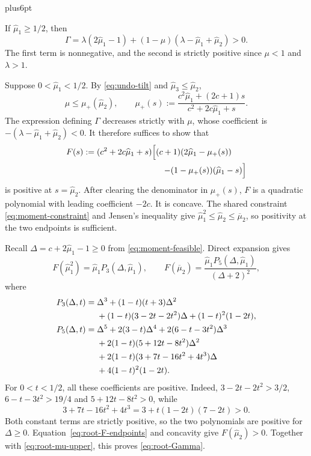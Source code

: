 \documentclass[11pt,reqno]{amsart}
\makeatletter
\theoremstyle{plain}
\theoremstyle{definition}
\theoremstyle{remark}
\renewenvironment{proof}[1][\proofname]{%
  \par
  \pushQED{\qed}%
  \normalfont
  \topsep6pt plus6pt\relax
  \trivlist
  \item[\hskip\labelsep\slshape #1\@addpunct{.}]%
  \ignorespaces
}{%
  \popQED
  \endtrivlist
  \@endpefalse
}
\DeclareRobustCommand{\qed}{%
  \leavevmode\unskip\penalty9999\hbox{}\nobreak
  \ifmmode
    \makebox[0pt][l]{\qquad\hbox{\qedsymbol}}%
  \else
    \qquad\hbox{\qedsymbol}%
  \fi
}
\renewcommand{\qedsymbol}{\rule[.47pt]{4pt}{6pt}}
\numberwithin{equation}{section}
\makeatother
\begin{document}
\begin{proof}
If $\widehat\mu_1\ge1/2$, then
\[
 \Gamma=\lambda(2\widehat\mu_1-1)
       +(1-\mu)(\lambda-\widehat\mu_1+\widehat\mu_2)>0.
\]
The first term is nonnegative, and the second is strictly positive since
$\mu<1$ and $\lambda>1$.

Suppose $0<\widehat\mu_1<1/2$. By \eqref{eq:undo-tilt} and
$\widehat\mu_3\le\widehat\mu_2$,
\begin{equation}\label{eq:root-mu-upper}
 \mu\le\mu_+(\widehat\mu_2),\qquad
 \mu_+(s):=
 \frac{c^2\widehat\mu_1+(2c+1)s}
      {c^2+2c\widehat\mu_1+s}.
\end{equation}
The expression defining $\Gamma$ decreases strictly with $\mu$, whose
coefficient is $-(\lambda-\widehat\mu_1+\widehat\mu_2)<0$.
It therefore suffices to show that
\begin{equation}\label{eq:root-F}
 \begin{aligned}
 F(s):={}&(c^2+2c\widehat\mu_1+s)\Bigl[
  (c+1)(2\widehat\mu_1-\mu_+(s))\Bigr.\\
 &\hspace{8em}\Bigl.
  -(1-\mu_+(s))(\widehat\mu_1-s)\Bigr]
 \end{aligned}
\end{equation}
is positive at $s=\widehat\mu_2$.
After clearing the denominator in $\mu_+(s)$, $F$ is a quadratic
polynomial with leading coefficient $-2c$. It is concave. The shared
constraint \eqref{eq:moment-constraint} and Jensen's inequality give
$\widehat\mu_1^2\le\widehat\mu_2\le\overline\mu_2$, so positivity at
the two endpoints is sufficient.

Recall $\Delta=c+2\widehat\mu_1-1\ge0$ from
\eqref{eq:moment-feasible}. Direct expansion gives
\begin{equation}\label{eq:root-F-endpoints}
 F(\widehat\mu_1^2)=\widehat\mu_1P_3(\Delta,\widehat\mu_1),\qquad
 F(\overline\mu_2)
 =\frac{\widehat\mu_1P_5(\Delta,\widehat\mu_1)}{(\Delta+2)^2},
\end{equation}
where
\begin{align}
 P_3(\Delta,t)
 ={}&\Delta^3+(1-t)(t+3)\Delta^2\notag\\
 &+(1-t)(3-2t-2t^2)\Delta+(1-t)^2(1-2t),
 \label{eq:root-P3}\\
 P_5(\Delta,t)
 ={}&\Delta^5+2(3-t)\Delta^4+2(6-t-3t^2)\Delta^3\notag\\
 &+2(1-t)(5+12t-8t^2)\Delta^2\notag\\
 &+2(1-t)(3+7t-16t^2+4t^3)\Delta\notag\\
 &+4(1-t)^2(1-2t).
 \label{eq:root-P5}
\end{align}
For $0<t<1/2$, all these coefficients are positive. Indeed,
$3-2t-2t^2>3/2$, $6-t-3t^2>19/4$ and $5+12t-8t^2>0$, while
\[
 3+7t-16t^2+4t^3=3+t(1-2t)(7-2t)>0.
\]
Both constant terms are strictly positive, so the two polynomials are
positive for $\Delta\ge0$. Equation~\eqref{eq:root-F-endpoints} and
concavity give $F(\widehat\mu_2)>0$. Together with
\eqref{eq:root-mu-upper}, this proves \eqref{eq:root-Gamma}.
\end{proof}
\end{document}

